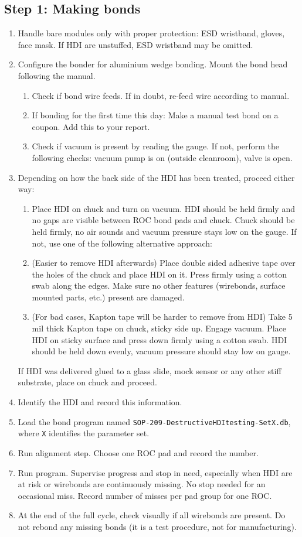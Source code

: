 \documentclass[10pt]{unlsilabsop}
\begin{document}
\subsection{Step 1: Making bonds}
\begin{enumerate}
    \item Handle bare modules only with proper protection: ESD wristband, gloves, face mask. If HDI are unstuffed, ESD wristband may be omitted.
    \item Configure the bonder for aluminium wedge bonding. Mount the bond head following the manual.
    \begin{enumerate}
	\item Check if bond wire feeds. If in doubt, re-feed wire according to manual.
	\item If bonding for the first time this day: Make a manual test bond on a coupon. Add this to your report.
	\item Check if vacuum is present by reading the gauge. If not, perform the following checks: vacuum pump is on (outside cleanroom), valve is open.
    \end{enumerate}
    \item Depending on how the back side of the HDI has been treated, proceed either way:
    \begin{enumerate}
	\item Place HDI on chuck and turn on vacuum. HDI should be held firmly and no gaps are visible between ROC bond pads and chuck. Chuck should be held firmly, no air sounds and vacuum pressure stays low on the gauge. If not, use one of the following alternative approach:
	\item (Easier to remove HDI afterwards) Place double sided adhesive tape over the holes of the chuck and place HDI on it. Press firmly using a cotton swab along the edges. Make sure no other features (wirebonds, surface mounted parts, etc.) present are damaged.
	\item (For bad cases, Kapton tape will be harder to remove from HDI) Take 5\,mil thick Kapton tape on chuck, sticky side up. Engage vacuum. Place HDI on sticky surface and press down firmly using a cotton swab. HDI should be held down evenly, vacuum pressure should stay low on gauge.
    \end{enumerate}
    If HDI was delivered glued to a glass slide, mock sensor or any other stiff substrate, place on chuck and proceed.
    \item Identify the HDI and record this information.
    \item Load the bond program named \texttt{SOP-209-DestructiveHDItesting-SetX.db}, where \texttt{X} identifies the parameter set.
    \item Run alignment step. Choose one ROC pad and record the number.
    \item Run program. Supervise progress and stop in need, especially when HDI are at risk or wirebonds are continuously missing. No stop needed for an occasional miss. Record number of misses per pad group for one ROC.
    \item At the end of the full cycle, check visually if all wirebonds are present. Do not rebond any missing bonds (it is a test procedure, not for manufacturing).
\end{enumerate}
\end{document}
